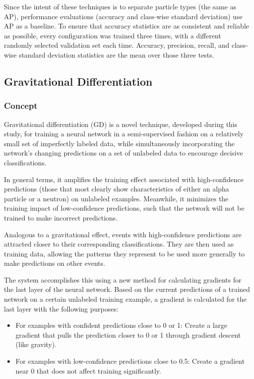\documentclass[10pt]{article}
\begin{document}
Since the intent of these techniques is to separate particle types (the same as AP), performance evaluations (accuracy and class-wise standard deviation) use AP as a baseline. To ensure that accuracy statistics are as consistent and reliable as possible, every configuration was trained three times, with a different randomly selected validation set each time. Accuracy, precision, recall, and class-wise standard deviation statistics are the mean over those three tests.

\subsection{Gravitational Differentiation}

\subsubsection{Concept}

Gravitational differentiation (GD) is a novel technique, developed during this study, for training a neural network in a semi-supervised fashion on a relatively small set of imperfectly labeled data, while simultaneously incorporating the network's changing predictions on a set of unlabeled data to encourage decisive classifications.

In general terms, it amplifies the training effect associated with high-confidence predictions (those that most clearly show characteristics of either an alpha particle or a neutron) on unlabeled examples. Meanwhile, it minimizes the training impact of low-confidence predictions, such that the network will not be trained to make incorrect predictions.

Analogous to a gravitational effect, events with high-confidence predictions are attracted closer to their corresponding classifications. They are then used as training data, allowing the patterns they represent to be used more generally to make predictions on other events.

The system accomplishes this using a new method for calculating gradients for the last layer of the neural network. Based on the current predictions of a trained network on a certain unlabeled training example, a gradient is calculated for the last layer with the following purposes:

\begin{itemize}
    \item For examples with confident predictions close to 0 or 1: Create a large gradient that pulls the prediction closer to 0 or 1 through gradient descent (like gravity).
    \item For examples with low-confidence predictions close to 0.5: Create a gradient near 0 that does not affect training significantly.
\end{itemize}
\end{document}
